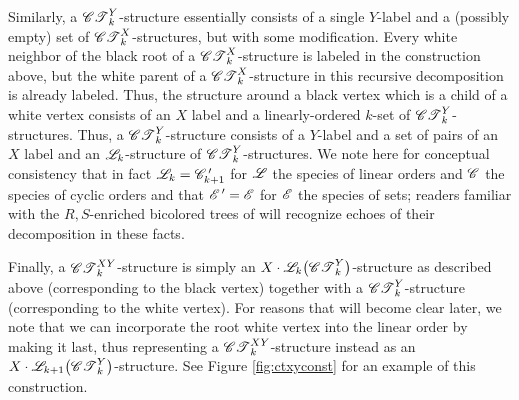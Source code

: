 \documentclass[distribution,draft]{brandiss} %
\numberwithin{section}{chapter}
\numberwithin{figure}{chapter}
\begin{document}
Similarly, a $\mathscr{CT}_{k}^{Y}$-structure essentially consists of a single $Y$-label and a (possibly empty) set of $\mathscr{CT}_{k}^{X}$-structures, but with some modification.
Every white neighbor of the black root of a $\mathscr{CT}_{k}^{X}$-structure is labeled in the construction above, but the white parent of a $\mathscr{CT}_{k}^{X}$-structure in this recursive decomposition is already labeled.
Thus, the structure around a black vertex which is a child of a white vertex consists of an $X$ label and a linearly-ordered $k$-set of $\mathscr{CT}_{k}^{Y}$-structures.
Thus, a $\mathscr{CT}_{k}^{Y}$-structure consists of a $Y$-label and a set of pairs of an $X$ label and an $\mathscr{L}_{k}$-structure of $\mathscr{CT}_{k}^{Y}$-structures.
We note here for conceptual consistency that in fact $\mathscr{L}_{k} =  {\mathscr{C}}^{\,\prime } _{k+1}$ for $\mathscr{L}$ the species of linear orders and $\mathscr{C}$ the species of cyclic orders and that $ {\mathscr{E}}^{\,\prime }  = \mathscr{E}$ for $\mathscr{E}$ the species of sets; readers familiar with the $R, S$-enriched bicolored trees of \cite[\S 3.2]{bll:species} will recognize echoes of their decomposition in these facts.

Finally, a $\mathscr{CT}_{k}^{XY}$-structure is simply an $X \cdot \specname{L}_{k} \pbracs[big]{\cty{k}}$-structure as described above (corresponding to the black vertex) together with a $\mathscr{CT}_{k}^{Y}$-structure (corresponding to the white vertex).
For reasons that will become clear later, we note that we can incorporate the root white vertex into the linear order by making it last, thus representing a $\mathscr{CT}_{k}^{XY}$-structure instead as an $X \cdot \specname{L}_{k+1} \pbracs[big]{\cty{k}}$-structure.
See Figure \ref{fig:ctxyconst} for an example of this construction.
\end{document}
